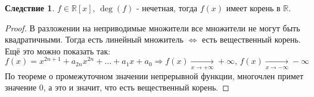 \documentclass[12pt]{article}
\newcommand{\MR}{\mathbb{R}}
\theoremstyle{definition}
\newtheorem{corollary}{Следствие}
\begin{document}
\begin{corollary}
	$f \in \MR[x], \, \deg(f)$ - нечетная, тогда $f(x)$ имеет корень в $\MR$.
\end{corollary}
\begin{proof}
	В разложении на неприводимые множители все множители не могут быть квадратичными. Тогда есть линейный множитель $\Leftrightarrow$ есть вещественный корень. Ещё это можно показать так:
	$$
		f(x) = x^{2n + 1} + a_{2n}x^{2n} + \dotsc + a_1x + a_0 \Rightarrow f(x) \xrightarrow[x \to +\infty]{} + \infty, \, f(x) \xrightarrow[x \to -\infty]{}  -\infty
	$$
	По теореме о промежуточном значении непрерывной функции, многочлен примет значение $0$, а это и значит, что есть вещественный корень.
\end{proof}
\end{document}
